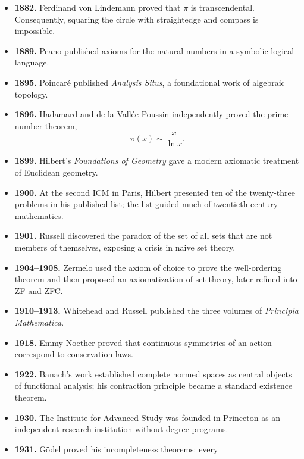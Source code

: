 \begin{itemize}
        \item \textbf{1882.} Ferdinand von Lindemann proved that $\pi$ is
              transcendental. Consequently, squaring the circle with straightedge
              and compass is impossible.
        \item \textbf{1889.} Peano published axioms for the natural numbers in
              a symbolic logical language.
        \item \textbf{1895.} Poincaré published \textit{Analysis Situs}, a
              foundational work of algebraic topology.
        \item \textbf{1896.} Hadamard and de la Vallée Poussin independently
              proved the prime number theorem,
              \[
                  \pi(x)\sim\frac{x}{\ln x}.
              \]
        \item \textbf{1899.} Hilbert's
              \textit{Foundations of Geometry} gave a modern axiomatic treatment
              of Euclidean geometry.
        \item \textbf{1900.} At the second ICM in Paris, Hilbert presented ten
              of the twenty-three problems in his published list; the list
              guided much of twentieth-century mathematics.
        \item \textbf{1901.} Russell discovered the paradox of the set of all
              sets that are not members of themselves, exposing a crisis in
              naive set theory.
        \item \textbf{1904--1908.} Zermelo used the axiom of choice to prove the
              well-ordering theorem and then proposed an axiomatization of set
              theory, later refined into ZF and ZFC.
        \item \textbf{1910--1913.} Whitehead and Russell published the three
              volumes of \textit{Principia Mathematica}.
        \item \textbf{1918.} Emmy Noether proved that continuous symmetries of
              an action correspond to conservation laws.
        \item \textbf{1922.} Banach's work established complete normed spaces
              as central objects of functional analysis; his contraction
              principle became a standard existence theorem.
        \item \textbf{1930.} The Institute for Advanced Study was founded in
              Princeton as an independent research institution without degree
              programs.
        \item \textbf{1931.} Gödel proved his incompleteness theorems: every

\end{itemize}
